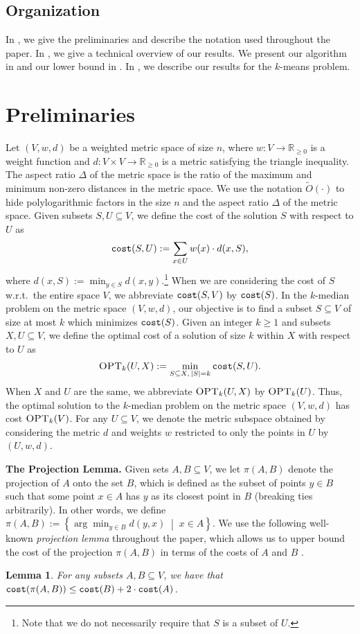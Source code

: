 \documentclass[11pt]{article}
\newcommand{\1}{\mathmybb{1}}
\newtheorem{lemma}[theorem]{Lemma}
\newcommand{\proj}{\pi}
\newcommand{\OPT}{\textsc{OPT}}
\newcommand{\cost}{\textnormal{\texttt{cost}}}
\begin{document}
\subsection{Organization}
In , we give the preliminaries and describe the notation used throughout the paper. In , we give a technical overview of our results. We present our algorithm in  and our lower bound in . In , we describe our results for the $k$-means problem.




 
\section{Preliminaries}\label{sec:prelim}
Let $(V, w, d)$ be a weighted metric space of size $n$, where $w: V \longrightarrow \mathbb R_{\geq 0}$ is a weight function and $d: V \times V \longrightarrow \mathbb R_{\geq 0}$ is a metric satisfying the triangle inequality. The aspect ratio $\Delta$ of the metric space is the ratio of the maximum and minimum non-zero distances in the metric space. We use the notation $\tilde O(\cdot)$ to hide polylogarithmic factors in the size $n$ and the aspect ratio $\Delta$ of the metric space.
Given subsets $S, U \subseteq V$, we define the cost of the solution $S$ with respect to $U$ as
$$ \cost(S, U) := \sum_{x \in U} w(x) \cdot d(x,S), $$
where $d(x, S) := \min_{y \in S} d(x,y)$.\footnote{Note that we do not necessarily require that $S$ is a subset of $U$.} When we are considering the cost of $S$ w.r.t.~the entire space $V$, we abbreviate $\cost(S,V)$ by $\cost(S)$. 
In the $k$-median problem on the metric space $(V,w,d)$, our objective is to find a subset $S \subseteq V$ of size at most $k$ which minimizes $\cost(S)$.
Given an integer $k \geq 1$ and subsets $X, U \subseteq V$, we define the optimal cost of a solution of size $k$ within $X$ with respect to $U$ as
$$\OPT_k(U, X) := \min_{S \subseteq X, \, |S| = k} \cost(S, U).$$
When $X$ and $U$ are the same, we abbreviate $\OPT_k(U,X)$ by $\OPT_k(U)$.
Thus, the optimal solution to the $k$-median problem on the metric space $(V,w,d)$ has cost $\OPT_k(V)$.
For any $U \subseteq V$, we denote the metric subspace obtained by considering the metric $d$ and weights $w$ restricted to only the points in $U$ by $(U,w,d)$.

\medskip
\noindent \textbf{The Projection Lemma.} Given sets $A, B \subseteq V$, we let $\proj(A,B)$ denote the projection of $A$ onto the set $B$, which is defined as the subset of points $y \in B$ such that some point $x \in A$ has $y$ as its closest point in $B$ (breaking ties arbitrarily). In other words, we define
$ \proj(A,B) := \left\{\arg \min_{y \in B} d(y, x) \; \middle| \; x \in A\right\}$.
We use the following well-known \emph{projection lemma} throughout the paper, which allows us to upper bound the cost of the projection $\proj(A,B)$ in terms of the costs of $A$ and $B$ \cite{GuptaT08, ChrobakKY06}.
\begin{lemma}\label{lem:projection}
    For any subsets $A, B \subseteq V$, we have that $\cost(\proj(A,B)) \leq \cost(B) + 2  \cdot \cost(A)$.
\end{lemma}
\end{document}

